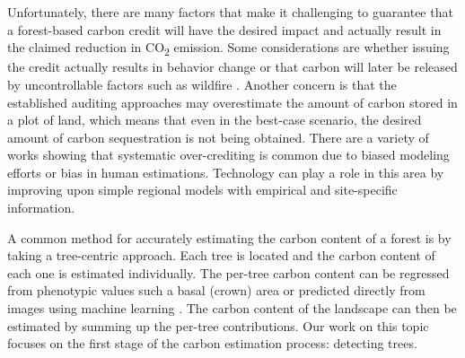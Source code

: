 Unfortunately, there are many factors that make it challenging to guarantee that a forest-based carbon credit will have the desired impact and actually result in the claimed reduction in CO\textsubscript{2} emission. Some considerations are whether issuing the credit actually results in behavior change \cite{Gillenwater2011TheProgramme} or that carbon will later be released by uncontrollable factors such as wildfire \cite{Kaplan2023AccountingMarkets}. Another concern is that the established auditing approaches may overestimate the amount of carbon stored in a plot of land, which means that even in the best-case scenario, the desired amount of carbon sequestration is not being obtained. There are a variety of works showing that systematic over-crediting is common \cite{Badgley2022SystematicProgram,West2020OverstatedAmazon} due to biased modeling efforts or bias in human estimations. Technology can play a role in this area by improving upon simple regional models with empirical and site-specific information.

A common method for accurately estimating the carbon content of a forest is by taking a tree-centric approach. Each tree is located and the carbon content of each one is estimated individually. The per-tree carbon content can be regressed from phenotypic values such a basal (crown) area \cite{Torres2013UsingMexico} or predicted directly from images using machine learning \cite{Reiersen2022ReforesTree:Imagery}. The carbon content of the landscape can then be estimated by summing up the per-tree contributions. Our work on this topic focuses on the first stage of the carbon estimation process: detecting trees.

